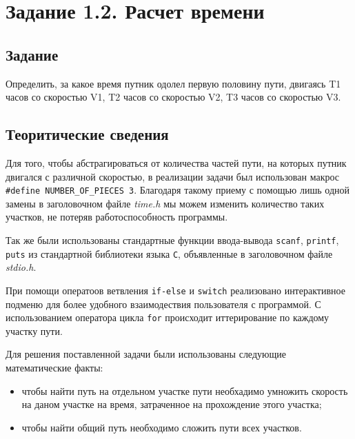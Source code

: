 \documentclass[12pt,a4paper]{report}
\begin{document}
\newpage

\section{Задание 1.2. Расчет времени}
\subsection{Задание}
\hspace{\parindent}Определить, за какое время путник одолел первую половину пути, двигаясь T1 часов со скоростью V1, T2 часов со скоростью V2, T3 часов со скоростью V3.

\subsection{Теоритические сведения}
\hspace{\parindent}Для того, чтобы абстрагироваться от количества частей пути, на которых путник двигался с различной скоростью, в реализации задачи был использован макрос \verb+#define NUMBER_OF_PIECES 3+. Благодаря такому приему с помощью лишь одной замены в заголовочном файле \textit{time.h} мы можем изменить количество таких участков, не потеряв работоспособность программы.

Так же были использованы стандартные функции ввода-вывода \texttt{scanf}, \texttt{printf}, \texttt{puts} из стандартной библиотеки языка \verb+С+, объявленные в заголовочном файле \textit{stdio.h}.

При помощи оператоов ветвления \texttt{if-else} и \texttt{switch} реализовано интерактивное подменю для более удобного взаимодествия пользователя с программой. С использованием оператора цикла \texttt{for} происходит иттерирование по каждому участку пути.

Для решения поставленной задачи были использованы следующие математические факты: 
\begin{itemize}
\item чтобы найти путь на отдельном участке пути необхадимо умножить скорость на даном участке на время, затраченное на прохождение этого участка;
\item чтобы найти общий путь необходимо сложить пути всех участков.
\end{itemize}
\end{document}
